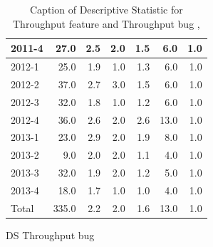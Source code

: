\documentclass[UKenglish]{ifimaster}  %
\begin{document}
\begin{appendices}
\begin{table}[!htbp]
\begin{adjustwidth}{-2.5cm}{}
\begin{subfigure}[b]{0.3\textwidth}
{\begin{tabular}{ | l | r | r | r | r | r | r | }
2011-4 & 27.0 & 2.5 & 2.0 & 1.5 & 6.0 & 1.0\\ \hline
2012-1 & 25.0 & 1.9 & 1.0 & 1.3 & 6.0 & 1.0\\ \hline
2012-2 & 37.0 & 2.7 & 3.0 & 1.5 & 6.0 & 1.0\\ \hline
2012-3 & 32.0 & 1.8 & 1.0 & 1.2 & 6.0 & 1.0\\ \hline
2012-4 & 36.0 & 2.6 & 2.0 & 2.6 & 13.0 & 1.0\\ \hline
2013-1 & 23.0 & 2.9 & 2.0 & 1.9 & 8.0 & 1.0\\ \hline
2013-2 & 9.0 & 2.0 & 2.0 & 1.1 & 4.0 & 1.0\\ \hline
2013-3 & 32.0 & 1.9 & 2.0 & 1.2 & 5.0 & 1.0\\ \hline
2013-4 & 18.0 & 1.7 & 1.0 & 1.0 & 4.0 & 1.0\\ \hline
Total & 335.0 & 2.2 & 2.0 & 1.6 & 13.0 & 1.0\\ \hline
\end{tabular}
}
\caption{DS Throughput bug}
 \label{DS:TPB:10}
\end{subfigure}
\end{adjustwidth}
\caption[Optional caption for list of figures]{Caption of Descriptive Statistic for Throughput feature and Throughput bug  , }
\label{DS:10:2}
\end{table}




\end{appendices}
\end{document}
